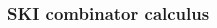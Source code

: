 \documentclass[aspectratio=169]{beamer}
\begin{document}
\begin{frame}
\frametitle{SKI combinator calculus}
\begin{columns}
\begin{column}{0.5\textwidth}
    \begin{figure}[ht]\centering
    \end{figure}
\end{column}
\begin{column}{0.5\textwidth}
    \begin{figure}[ht]\centering
    \end{figure}
\end{column}
\end{columns}
\end{frame}
\end{document}
